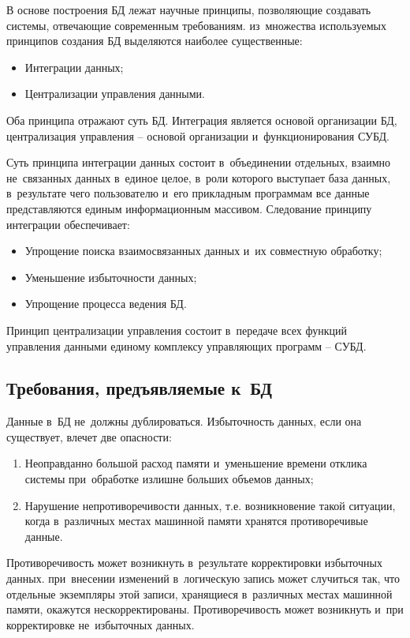\documentclass{ou}
\begin{document}
В основе построения БД лежат научные принципы, позволяющие создавать системы, отвечающие современным требованиям. из~множества используемых принципов создания БД выделяются наиболее существенные:
\begin{itemize}[label=-, itemindent=4em, nosep]
\item Интеграции данных;
\item Централизации управления данными.
\end{itemize}

Оба принципа отражают суть БД. Интеграция является основой организации БД, централизация управления -- основой организации и~функционирования СУБД. 

Суть принципа интеграции данных состоит в~объединении отдельных, взаимно не~связанных данных в~единое целое, в~роли которого выступает база данных, в~результате чего пользователю и~его прикладным программам все данные представляются единым информационным массивом. Следование принципу интеграции обеспечивает:
\begin{itemize}[label=-, itemindent=4em, nosep]
\item Упрощение поиска взаимосвязанных данных и~их совместную обработку;
\item Уменьшение избыточности данных;
\item Упрощение процесса ведения БД.
\end{itemize}

Принцип централизации управления состоит в~передаче всех функций управления данными единому комплексу управляющих программ -- СУБД.

\subsection{Требования, предъявляемые к~БД}
Данные в~БД не~должны дублироваться. Избыточность данных, если она существует, влечет две опасности: 
\begin{enumerate}[itemindent=4em, nosep, label=\arabic*)]
\item Неоправданно большой расход памяти и~уменьшение времени отклика системы при~обработке излишне больших объемов данных;
\item Нарушение непротиворечивости данных, т.е. возникновение такой ситуации, когда в~различных местах машинной памяти хранятся противоречивые данные.
\end{enumerate}

Противоречивость может возникнуть в~результате корректировки избыточных данных. при~внесении изменений в~логическую запись может случиться так, что отдельные экземпляры этой записи, хранящиеся в~различных местах машинной памяти, окажутся нескорректированы. Противоречивость может возникнуть и~при корректировке не~избыточных данных.
\end{document}
